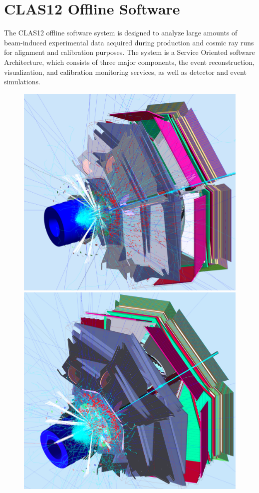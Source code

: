 \documentclass[final,3p,times,twocolumn,authoryear]{elsarticle}
\begin{document}
\section{CLAS12 Offline Software}  
The CLAS12 offline software system is designed to analyze large amounts of beam-induced experimental data acquired during production and cosmic ray runs for alignment and calibration purposes. The system is a Service Oriented software Architecture, which consists of three major components, the event reconstruction, visualization, and calibration
monitoring services, as well as detector and event simulations.  
%
\begin{figure}[htbp!]
\centerline{\includegraphics[width=1.0\columnwidth]{50percentNoSolenoidNoTorus1.png}
\includegraphics[width=1.0\columnwidth]{50percentNoSolenoid2a.png}}

\end{figure}
\end{document}
